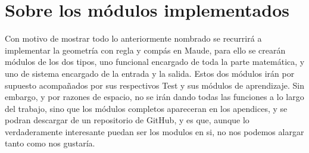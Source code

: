 \section{Sobre los módulos implementados}

Con motivo de mostrar todo lo anteriormente nombrado se recurrirá a implementar la geometría con regla y compás en Maude, para ello se crearán módulos de los dos tipos, uno funcional encargado de toda la parte matemática, y uno de sistema encargado de la entrada y la salida. Estos dos módulos irán por supuesto acompañados por sus respectivos Test y sus módulos de aprendizaje. Sin embargo, y por razones de espacio, no se irán dando todas las funciones a lo largo del trabajo, sino que los módulos completos apareceran en los apendices, y se podran descargar de un repositorio de GitHub, y es que, aunque lo verdaderamente interesante puedan ser los modulos en si, no nos podemos alargar tanto como nos gustaría.\par

